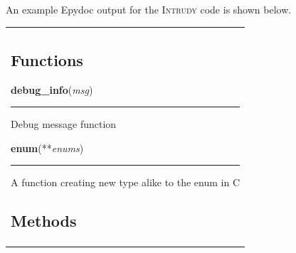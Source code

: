 \documentclass[12pt,a4paper]{scrartcl}
\newcommand{\intrudy}{\textsc{Intrudy}\xspace}
\newenvironment{algorithmframe}
{\begin{tabular}{|p{0.95\textwidth}}}%
{\end{tabular}}
\newlength{\funcindent}
\newlength{\funcwidth}
\begin{document}
An example Epydoc output for the \intrudy code is shown below.

\begin{algorithmframe}
\subsection*{Functions}

    \label{controller:debug_info}
    \index{controller \textit{(module)}!controller.debug\_info \textit{(function)}}

    \vspace{0.5ex}

\hspace{.8\funcindent}\begin{boxedminipage}{\funcwidth}

    \raggedright \textbf{debug\_info}(\textit{msg})

    \vspace{-1.5ex}

    \rule{\textwidth}{0.5\fboxrule}
\setlength{\parskip}{2ex}
    Debug message function

\setlength{\parskip}{1ex}
    \end{boxedminipage}

    \label{controller:enum}
    \index{controller \textit{(module)}!controller.enum \textit{(function)}}

    \vspace{0.5ex}

\hspace{.8\funcindent}\begin{boxedminipage}{\funcwidth}

    \raggedright \textbf{enum}(**\textit{enums})

    \vspace{-1.5ex}

    \rule{\textwidth}{0.5\fboxrule}
\setlength{\parskip}{2ex}
    A function creating new type alike to the enum in C

\setlength{\parskip}{1ex}
    \end{boxedminipage}



\subsection*{Methods}

    \vspace{0.5ex}

\hspace{.8\funcindent}\begin{boxedminipage}{\funcwidth}


\end{boxedminipage}
\end{algorithmframe}
\end{document}
